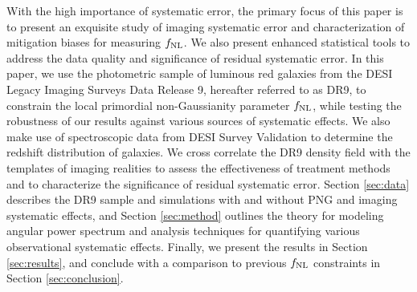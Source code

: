  With the high importance of systematic error, the primary focus of this paper is to present an exquisite study of imaging systematic error and characterization of mitigation biases for measuring $f_{\rm NL}$. We also present enhanced statistical tools to address the data quality and significance of residual systematic error. In this paper, we use the photometric sample of luminous red galaxies from the DESI Legacy Imaging Surveys Data Release 9, hereafter referred to as DR9, to constrain the local primordial non-Gaussianity parameter $f_{\rm NL}$, while testing the robustness of our results against various sources of systematic effects. We also make use of spectroscopic data from DESI Survey Validation to determine the redshift distribution of galaxies. We cross correlate the DR9 density field with the templates of imaging realities to assess the effectiveness of treatment methods and to characterize the significance of residual systematic error. Section \ref{sec:data} describes the DR9 sample and simulations with and without PNG and imaging systematic effects, and Section \ref{sec:method} outlines the theory for modeling angular power spectrum and analysis techniques for quantifying various observational systematic effects. Finally, we present the results in Section \ref{sec:results}, and conclude with a comparison to previous $f_{\rm NL}$ constraints in Section \ref{sec:conclusion}.